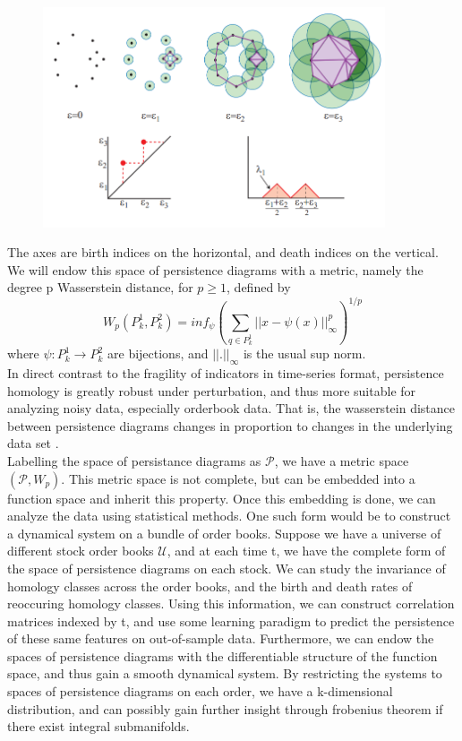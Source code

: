 \documentclass[14pt]{extarticle}
\begin{document}
\begin{figure}
\includegraphics[scale=0.3, height=6.5cm, keepaspectratio]{persistence_diagram}
\end{figure}

The axes are birth indices on the horizontal, and death indices on the vertical. We will endow this space of persistence diagrams with a metric, namely the degree p Wasserstein distance, for $p\geq 1$, defined by
\begin{equation*}
W_p(P^1_k, P^2_k) = inf_\psi(\sum_{q\in P_k^1}||x-\psi(x)||^p_\infty)^{1/p}
\end{equation*}
where $\psi:P_k^1\to P_k^2$ are bijections, and $||.||_\infty$ is the usual sup norm.\\
In direct contrast to the fragility of indicators in time-series format, persistence homology is greatly robust under perturbation, and thus more suitable for analyzing noisy data, especially orderbook data. That is, the wasserstein distance between persistence diagrams changes in proportion to changes in the underlying data set \cite{chazal2017introduction}.\\
Labelling the space of persistance diagrams as $\mathcal{P}$, we have a metric space $(\mathcal{P},W_p)$. This metric space is not complete, but can be embedded into a function space and inherit this property. 
Once this embedding is done, we can analyze the data using statistical methods. One such form would be to construct a dynamical system on a bundle of order books. Suppose we have a universe of different stock order books $\mathcal{U}$, and at each time t, we have the complete form of the space of persistence diagrams on each stock. We can study the invariance of homology classes across the order books, and the birth and death rates of reoccuring homology classes. Using this information, we can construct correlation matrices indexed by t, and use some learning paradigm to predict the persistence of these same features on out-of-sample data. Furthermore, we can endow the spaces of persistence diagrams with the differentiable structure of the function space, and thus gain a smooth dynamical system. By restricting the systems to spaces of persistence diagrams on each order, we have a k-dimensional distribution, and can possibly gain further insight through frobenius theorem if there exist integral submanifolds.
\end{document}
